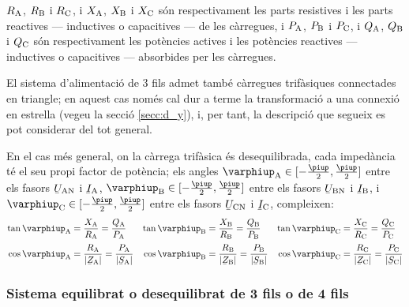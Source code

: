 $R_\mathrm{A}$, $R_\mathrm{B}$ i $R_\mathrm{C}$, i $X_\mathrm{A}$, $X_\mathrm{B}$ i
$X_\mathrm{C}$ són respectivament les parts resistives i les parts
reactives --- inductives o capacitives --- de les càrregues, i $P_\mathrm{A}$,
$P_\mathrm{B}$ i $P_\mathrm{C}$, i $Q_\mathrm{A}$, $Q_\mathrm{B}$ i $Q_\mathrm{C}$ són
respectivament les potències actives i les potències reactives
--- inductives o capacitives --- absorbides per les càrregues.

El sistema d'alimentació de 3 fils admet també càrregues
trifàsiques connectades en triangle; en aquest cas només cal dur a
terme la transformació a una connexió en estrella (vegeu la secció
\ref{secc:d_y}), i, per tant, la descripció que segueix es pot
considerar del tot general.

\begin{center}
    
    \label{pic:pot_comp_trif}
\end{center}

En el cas més general, on la càrrega trifàsica és desequilibrada,
cada impedància té el seu propi factor de potència; els angles
$\varphiup\ped{A}\in[-\frac{\piup}{2},\frac{\piup}{2}]$ entre els fasors $\cmplx{U}\ped{AN}$ i $\cmplx{I}\ped{A}$, $\varphiup\ped{B}\in[-\frac{\piup}{2},\frac{\piup}{2}]$ entre els fasors $\cmplx{U}\ped{BN}$ i $\cmplx{I}\ped{B}$, i $\varphiup\ped{C}\in[-\frac{\piup}{2},\frac{\piup}{2}]$ entre els fasors $\cmplx{U}\ped{CN}$ i $\cmplx{I}\ped{C}$, compleixen:
\begin{subequations}
\begin{align}
    \tan\varphiup\ped{A} &= \frac{X\ped{A}}{R\ped{A}} = \frac{Q\ped{A}}{P\ped{A}} &
    \tan\varphiup\ped{B} &= \frac{X\ped{B}}{R\ped{B}} = \frac{Q\ped{B}}{P\ped{B}} &
    \tan\varphiup\ped{C} &= \frac{X\ped{C}}{R\ped{C}} = \frac{Q\ped{C}}{P\ped{C}} \\[0.5ex]
    \cos\varphiup\ped{A} &= \frac{R\ped{A}}{|\cmplx{Z}\ped{A}|} = \frac{P\ped{A}}{|\cmplx{S}\ped{A}|} &
    \cos\varphiup\ped{B} &= \frac{R\ped{B}}{|\cmplx{Z}\ped{B}|} = \frac{P\ped{B}}{|\cmplx{S}\ped{B}|} &
    \cos\varphiup\ped{C} &= \frac{R\ped{C}}{|\cmplx{Z}\ped{C}|} = \frac{P\ped{C}}{|\cmplx{S}\ped{C}|}
\end{align}
\end{subequations}

\subsubsection{Sistema equilibrat o desequilibrat de 3 fils o de 4 fils}

